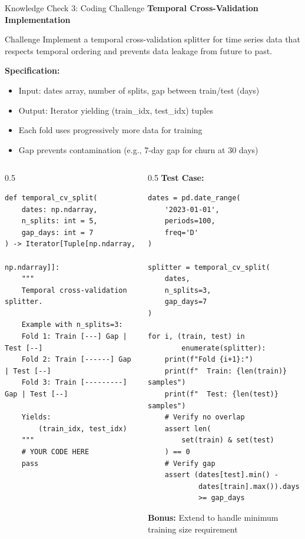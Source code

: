 \begin{frame}[fragile]{Knowledge Check 3: Coding Challenge}
\textbf{Temporal Cross-Validation Implementation}

\vspace{0.3cm}

\begin{block}{Challenge}
Implement a temporal cross-validation splitter for time series data that respects temporal ordering and prevents data leakage from future to past.

\textbf{Specification:}
\begin{itemize}
\item Input: dates array, number of splits, gap between train/test (days)
\item Output: Iterator yielding (train\_idx, test\_idx) tuples
\item Each fold uses progressively more data for training
\item Gap prevents contamination (e.g., 7-day gap for churn at 30 days)
\end{itemize}
\end{block}

\vspace{0.2cm}

\begin{columns}
\begin{column}{0.5\textwidth}
\small
\begin{verbatim}
def temporal_cv_split(
    dates: np.ndarray,
    n_splits: int = 5,
    gap_days: int = 7
) -> Iterator[Tuple[np.ndarray,
                    np.ndarray]]:
    """
    Temporal cross-validation splitter.

    Example with n_splits=3:
    Fold 1: Train [---] Gap | Test [--]
    Fold 2: Train [------] Gap | Test [--]
    Fold 3: Train [---------] Gap | Test [--]

    Yields:
        (train_idx, test_idx)
    """
    # YOUR CODE HERE
    pass
\end{verbatim}
\end{column}

\begin{column}{0.5\textwidth}
\textbf{Test Case:}
\small
\begin{verbatim}
dates = pd.date_range(
    '2023-01-01',
    periods=100,
    freq='D'
)

splitter = temporal_cv_split(
    dates,
    n_splits=3,
    gap_days=7
)

for i, (train, test) in
        enumerate(splitter):
    print(f"Fold {i+1}:")
    print(f"  Train: {len(train)} samples")
    print(f"  Test: {len(test)} samples")
    # Verify no overlap
    assert len(
        set(train) & set(test)
    ) == 0
    # Verify gap
    assert (dates[test].min() -
            dates[train].max()).days
            >= gap_days
\end{verbatim}

\vspace{0.2cm}
\textbf{Bonus:} Extend to handle minimum training size requirement
\end{column}
\end{columns}
\end{frame}

